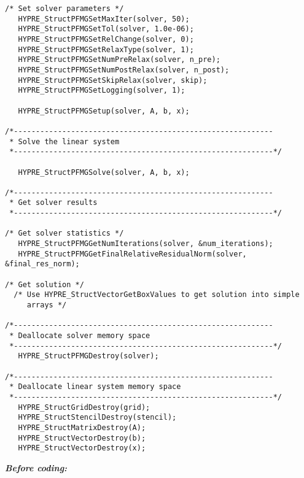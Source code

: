 \begin{display}
\begin{verbatim}
/* Set solver parameters */
   HYPRE_StructPFMGSetMaxIter(solver, 50);
   HYPRE_StructPFMGSetTol(solver, 1.0e-06);
   HYPRE_StructPFMGSetRelChange(solver, 0);
   HYPRE_StructPFMGSetRelaxType(solver, 1);
   HYPRE_StructPFMGSetNumPreRelax(solver, n_pre);
   HYPRE_StructPFMGSetNumPostRelax(solver, n_post);
   HYPRE_StructPFMGSetSkipRelax(solver, skip);
   HYPRE_StructPFMGSetLogging(solver, 1);

   HYPRE_StructPFMGSetup(solver, A, b, x);

/*-----------------------------------------------------------
 * Solve the linear system
 *-----------------------------------------------------------*/

   HYPRE_StructPFMGSolve(solver, A, b, x);

/*-----------------------------------------------------------
 * Get solver results
 *-----------------------------------------------------------*/

/* Get solver statistics */
   HYPRE_StructPFMGGetNumIterations(solver, &num_iterations);
   HYPRE_StructPFMGGetFinalRelativeResidualNorm(solver, &final_res_norm);

/* Get solution */
  /* Use HYPRE_StructVectorGetBoxValues to get solution into simple
     arrays */

/*-----------------------------------------------------------
 * Deallocate solver memory space 
 *-----------------------------------------------------------*/
   HYPRE_StructPFMGDestroy(solver);

/*-----------------------------------------------------------
 * Deallocate linear system memory space 
 *-----------------------------------------------------------*/
   HYPRE_StructGridDestroy(grid);
   HYPRE_StructStencilDestroy(stencil);
   HYPRE_StructMatrixDestroy(A);
   HYPRE_StructVectorDestroy(b);
   HYPRE_StructVectorDestroy(x);

\end{verbatim}
\end{display}


{\bf \it Before coding:}

